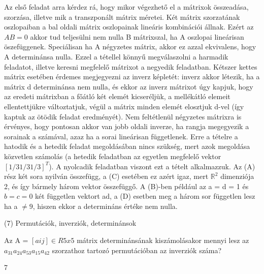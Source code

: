 \begin{frame}
  \begin{tcolorbox}[title={6/8. {\symqueen}}]
Az első feladat arra kérdez rá, hogy mikor végezhető el a mátrixok összeadása, szorzása, illetve mik a transzponált mátrix méretei. Két mátrix szorzatának oszlopaiban a bal oldali mátrix oszlopainak lineáris kombinációi állnak. Ezért az $AB = 0$ akkor tud teljesülni nem nulla B mátrixszal, ha A oszlopai lineárisan öszefüggenek. Speciálisan ha A négyzetes mátrix, akkor ez azzal ekvivalens, hogy A determinánsa nulla. Ezzel a tétellel könnyű megválaszolni a harmadik feladatot, illetve keresni megfelelő mátrixot a negyedik feladatban. Kétszer kettes mátrix esetében érdemes megjegyezni az inverz képletét: inverz akkor létezik, ha a mátrix d determinánsa nem nulla, és ekkor az inverz mátrixot úgy kapjuk, hogy az eredeti mátrixban a főátló két elemét kicseréljük, a mellékátló elemeit ellentettjükre változtatjuk, végül a mátrix minden elemét elosztjuk d-vel (így kaptuk az ötödik feladat eredményét). Nem feltétlenül négyzetes mátrixra is érvényes, hogy pontosan akkor van jobb oldali inverze, ha rangja megegyezik a sorainak a számával, azaz ha a sorai lineárisan függetlenek. Erre a tételre a hatodik és a hetedik feladat megoldásában nincs szükség, mert azok megoldása közvetlen számolás (a hetedik feladatban az egyetlen megfelelő vektor $[1/3 1/3 1/3]^T$). A nyolcadik feladatban viszont ezt a tételt alkalmazzuk. Az (A) rész két sora nyilván összefügg, a (C) esetében ez azért igaz, mert $\mathbb{R}^2$ dimenziója 2, és így bármely három vektor összefüggő. A (B)-ben például az a = d = 1 és $b = c = 0$ két független vektort ad, a (D) esetben meg a három sor független lesz ha a $\neq 9$, hiszen ekkor a determináns értéke nem nulla.
  \end{tcolorbox}
\end{frame}


\begin{frame}[plain]
\begin{tcolorbox}[center, colback={myyellow}, coltext={black}, colframe={myyellow}]
    {\RHuge  (7) Permutációk, inverziók, determinánsok}
    \mmedskip
\end{tcolorbox}
\end{frame}

\begin{frame}
  \begin{tcolorbox}[title={7/1. {\symknight}}]
    Az A = $[aij] \in R5x5$ mátrix determinánsának kiszámolásakor mennyi lesz az $a_31a_24a_53a_15a_42$ szorzathoz tartozó permutációban az inverziók száma?

  \tcblower

    \mmedskip 
    
    7
  \end{tcolorbox}
\end{frame}


